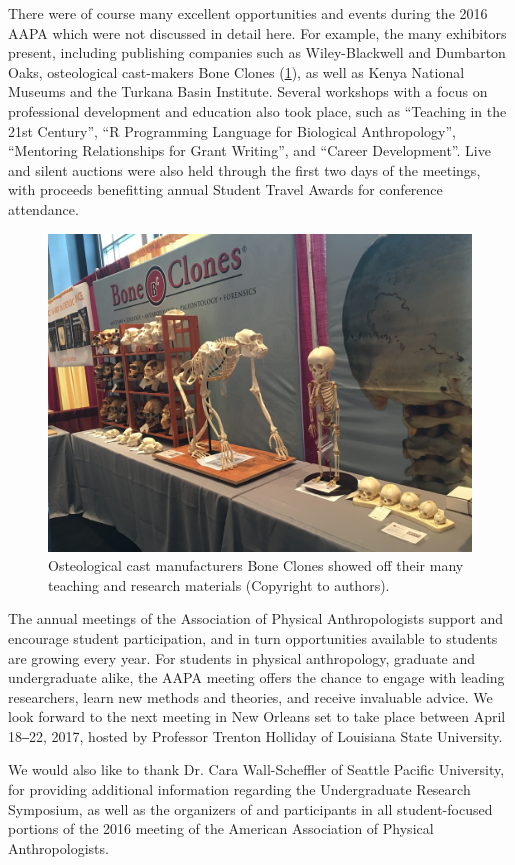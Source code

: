 \documentclass[english]{ijsra}
\begin{document}
There  were of course many excellent opportunities and events during the 2016 AAPA which were not discussed in detail here.
For example, the many exhibitors present, including publishing companies such as Wiley-Blackwell and Dumbarton Oaks,
osteological cast-makers Bone Clones (\cref{fig:Ward-Figure9}), as well as Kenya National Museums and the Turkana Basin Institute. 
Several workshops with a focus on professional development and education also took place, such as “Teaching in the 21st Century”,
“R Programming Language for Biological Anthropology”, “Mentoring Relationships for Grant Writing”, and  “Career Development”.
Live and silent auctions were also held through the first two days of the meetings, 
with proceeds benefitting annual Student Travel Awards for conference attendance.

	\begin{figure} %
		\includegraphics[width=\linewidth]{figures/Ward-Figure9}
		\caption{Osteological cast manufacturers Bone Clones showed off their many teaching and research materials (Copyright to authors).}
		\centering
		\label{fig:Ward-Figure9}
	\end{figure}

The annual meetings of the Association of Physical Anthropologists support and encourage student participation,
and in turn opportunities available to students are growing every year. For students in physical anthropology, 
graduate and undergraduate alike, the AAPA meeting offers the chance to engage with leading researchers,
learn new methods and theories, and receive invaluable advice. 
We look forward to the next meeting in New Orleans set to take place between April 18‒22, 2017, 
hosted by Professor Trenton Holliday of Louisiana State University.

We  would also like to thank Dr. Cara Wall-Scheffler of Seattle Pacific University,  
for providing additional information regarding the Undergraduate Research Symposium,
as well as the organizers of and participants in all student-focused portions of the 2016 meeting of
the American Association of Physical Anthropologists.
\IJSRAclosing%
\end{document}
